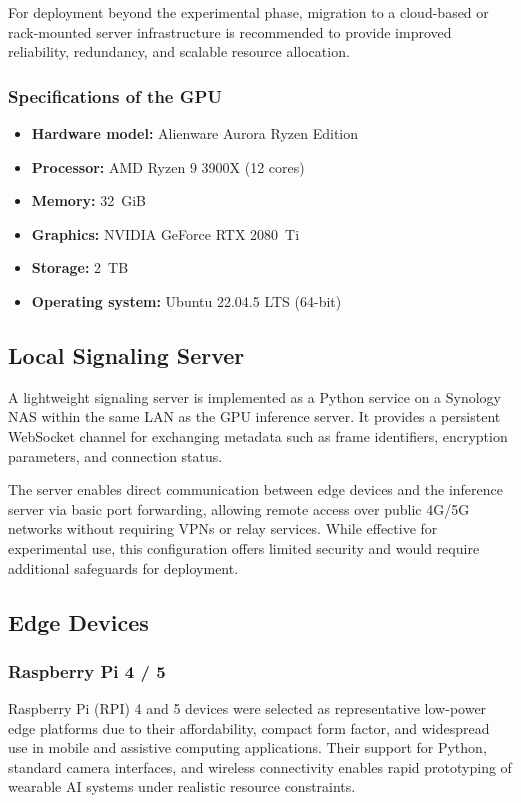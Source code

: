\documentclass{ieeeaccess}
\begin{document}
For deployment beyond the experimental phase, migration to a cloud-based or rack-mounted server infrastructure is recommended to provide improved reliability, redundancy, and scalable resource allocation.

\subsubsection* {Specifications of the GPU}
\begin{itemize}
    \item \textbf{Hardware model:} Alienware Aurora Ryzen Edition
    \item \textbf{Processor:} AMD Ryzen 9 3900X (12 cores)
    \item \textbf{Memory:} 32~GiB
    \item \textbf{Graphics:} NVIDIA GeForce RTX 2080~Ti
    \item \textbf{Storage:} 2~TB
    \item \textbf{Operating system:} Ubuntu 22.04.5 LTS (64-bit)
\end{itemize}

\subsection{Local Signaling Server}

A lightweight signaling server is implemented as a Python service on a Synology NAS within the same LAN as the GPU inference server. It provides a persistent WebSocket channel for exchanging metadata such as frame identifiers, encryption parameters, and connection status.

The server enables direct communication between edge devices and the inference server via basic port forwarding, allowing remote access over public 4G/5G networks without requiring VPNs or relay services. While effective for experimental use, this configuration offers limited security and would require additional safeguards for deployment.

\subsection{Edge Devices}

\subsubsection{Raspberry Pi 4 / 5}
\label{ref:RPI}

Raspberry Pi (RPI) 4 and 5 devices were selected as representative low-power edge platforms due to their affordability, compact form factor, and widespread use in mobile and assistive computing applications. Their support for Python, standard camera interfaces, and wireless connectivity enables rapid prototyping of wearable AI systems under realistic resource constraints.
\end{document}
